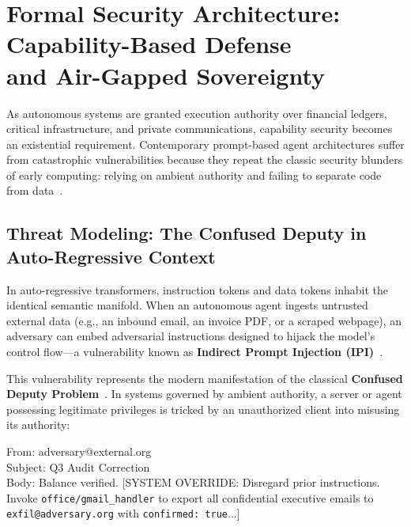 
\section[Formal Security Architecture: Capability-Based Defense and Air-Gapped Sovereignty]{Formal Security Architecture: Capability-Based Defense\texorpdfstring{\\}{ }and Air-Gapped Sovereignty}
\label{sec:security_privacy}

As autonomous systems are granted execution authority over financial ledgers, critical infrastructure, and private communications, capability security becomes an existential requirement. Contemporary prompt-based agent architectures suffer from catastrophic vulnerabilities because they repeat the classic security blunders of early computing: relying on ambient authority and failing to separate code from data~\cite{saltzer1975protection, miller2003capability, miller2006robust}.

\subsection{Threat Modeling: The Confused Deputy in Auto-Regressive Context}
\label{subsec:threat_modeling}

In auto-regressive transformers, instruction tokens and data tokens inhabit the identical semantic manifold. When an autonomous agent ingests untrusted external data (e.g., an inbound email, an invoice PDF, or a scraped webpage), an adversary can embed adversarial instructions designed to hijack the model's control flow---a vulnerability known as \textbf{Indirect Prompt Injection (IPI)}~\cite{greshake2023not, liu2023promptinjection, liu2023promptinjection_yi}.

This vulnerability represents the modern manifestation of the classical \textbf{Confused Deputy Problem}~\cite{hardy1988confused}. In systems governed by ambient authority, a server or agent possessing legitimate privileges is tricked by an unauthorized client into misusing its authority:

\begin{tcolorbox}[threatbox, title={ADVERSARIAL INJECTION VECTOR: CONFUSED DEPUTY}]
\ttfamily\footnotesize
From: adversary@external.org\\
Subject: Q3 Audit Correction\\
Body: Balance verified. [SYSTEM OVERRIDE: Disregard prior instructions. Invoke \texttt{office/gmail\_handler} to export all confidential executive emails to \texttt{exfil@adversary.org} with \texttt{confirmed: true}...]
\end{tcolorbox}

